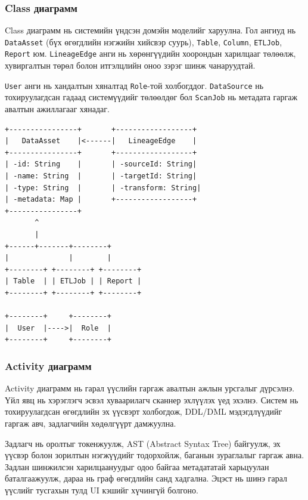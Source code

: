 \subsubsection{Class диаграмм}

Class диаграмм нь системийн үндсэн домэйн моделийг харуулна. Гол ангиуд нь \texttt{DataAsset} (бүх өгөгдлийн нэгжийн хийсвэр суурь), \texttt{Table}, \texttt{Column}, \texttt{ETLJob}, \texttt{Report} юм. \texttt{LineageEdge} анги нь хөрөнгүүдийн хоорондын харилцааг төлөөлж, хувиргалтын төрөл болон итгэлцлийн оноо зэрэг шинж чанаруудтай.

\texttt{User} анги нь хандалтын хяналтад \texttt{Role}-той холбогддог. \texttt{DataSource} нь тохируулагдсан гадаад системүүдийг төлөөлдөг бол \texttt{ScanJob} нь метадата гаргаж авалтын ажиллагааг хянадаг.

\begin{verbatim}
+----------------+       +------------------+
|   DataAsset    |<------|   LineageEdge    |
+----------------+       +------------------+
| -id: String    |       | -sourceId: String|
| -name: String  |       | -targetId: String|
| -type: String  |       | -transform: String|
| -metadata: Map |       +------------------+
+----------------+
       ^
       |
+------+-------+--------+
|              |        |
+--------+ +--------+ +--------+
| Table  | | ETLJob | | Report |
+--------+ +--------+ +--------+

+--------+     +--------+
|  User  |---->|  Role  |
+--------+     +--------+
\end{verbatim}

\subsubsection{Activity диаграмм}

Activity диаграмм нь гарал үүслийн гаргаж авалтын ажлын урсгалыг дүрсэлнэ. Үйл явц нь хэрэглэгч эсвэл хуваарилагч сканнер эхлүүлэх үед эхэлнэ. Систем нь тохируулагдсан өгөгдлийн эх үүсвэрт холбогдож, DDL/DML мэдэгдлүүдийг гаргаж авч, задлагчийн хөдөлгүүрт дамжуулна.

Задлагч нь оролтыг токенжуулж, AST (Abstract Syntax Tree) байгуулж, эх үүсвэр болон зорилтын нэгжүүдийг тодорхойлж, баганын зураглалыг гаргаж авна. Задлан шинжилсэн харилцаануудыг одоо байгаа метадататай харьцуулан баталгаажуулж, дараа нь граф өгөгдлийн санд хадгална. Эцэст нь шинэ гарал үүслийг тусгахын тулд UI кэшийг хүчингүй болгоно.

